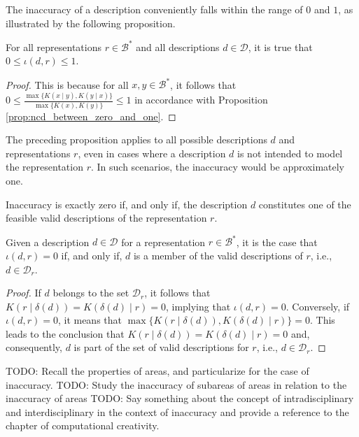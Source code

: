 {\color{red}

The inaccuracy of a description conveniently falls within the range of $0$ and $1$, as illustrated by the following proposition.

\begin{proposition}
\label{prop:inaccuracy:inaccuracy:range}
For all representations $r \in \mathcal{B}^\ast$ and all descriptions $d \in \mathcal{D}$, it is true that $0 \leq \iota(d, r) \leq 1$.
\end{proposition}
\begin{proof}
This is because for all $x, y \in \mathcal{B}^\ast$, it follows that $0 \leq \frac{ \max\{ K(x \mid y), K(y \mid x) \} } { \max\{ K(x), K(y) \} } \leq 1$ in accordance with Proposition \ref{prop:ncd_between_zero_and_one}.
\end{proof}

The preceding proposition applies to all possible descriptions $d$ and representations $r$, even in cases where a description $d$ is not intended to model the representation $r$. In such scenarios, the inaccuracy would be approximately one.

Inaccuracy is exactly zero if, and only if, the description $d$ constitutes one of the feasible valid descriptions of the representation $r$.

\begin{proposition}\label{prop:perfect_description}
Given a description $d \in \mathcal{D}$ for a representation $r \in \mathcal{B}^\ast$, it is the case that $\iota(d, r) = 0$ if, and only if, $d$ is a member of the valid descriptions of $r$, i.e., $d \in \mathcal{D}_r$.
\end{proposition}
\begin{proof}
If $d$ belongs to the set $\mathcal{D}_r$, it follows that $K \left( r \mid \delta(d) \right) = K \left( \delta(d) \mid r \right) = 0$, implying that $\iota(d, r) = 0$. Conversely, if $\iota(d, r) = 0$, it means that $\max\{ K \left( r \mid \delta(d) \right), K \left( \delta(d) \mid r \right) \} = 0$. This leads to the conclusion that $K \left( r \mid \delta(d) \right) = K \left( \delta(d) \mid r \right) = 0$ and, consequently, $d$ is part of the set of valid descriptions for $r$, i.e., $d \in \mathcal{D}_r$.
\end{proof}

}


{\color{red}

TODO: Recall the properties of areas, and particularize for the case of inaccuracy.
TODO: Study the inaccuracy of subareas of areas in relation to the inaccuracy of areas
TODO: Say something about the concept of intradisciplinary and interdisciplinary in the context
of inaccuracy and provide a reference to the chapter of computational creativity.

}

